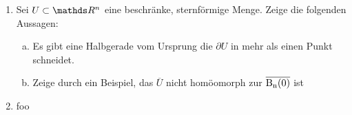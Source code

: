 \documentclass[ngerman]{scrartcl}
\begin{document}
\begin{Beh}
  \begin{enumerate}[(1)]
    \item Sei $U \subset \R^n$ eine beschränke, sternförmige Menge. Zeige 
      die folgenden Aussagen:
      \begin{enumerate}[a)]
        \item Es gibt eine Halbgerade vom Ursprung die $\partial U$ in mehr
          als einen Punkt schneidet.
        \item Zeige durch ein Beispiel, das $\overline{U}$ nicht homöomorph zur
          $\operatorname{\overline{\operatorname{B}_n(0)}}$ ist
      \end{enumerate}
      \item foo
    \end{enumerate}
\end{Beh}
\end{document}
